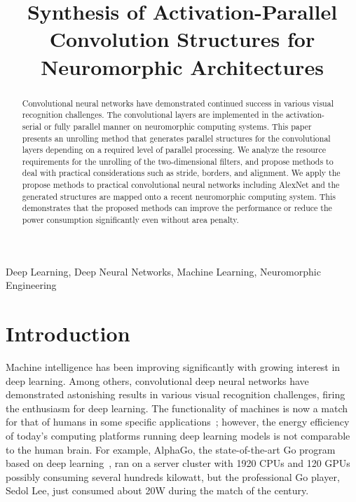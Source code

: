 \documentclass[journal]{IEEEtran}
\begin{document}
%

\title{Synthesis of Activation-Parallel Convolution Structures for Neuromorphic Architectures}

\maketitle
\begin{abstract}
Convolutional neural networks have demonstrated continued success in various visual recognition challenges. The convolutional layers are implemented in the activation-serial or fully parallel manner on neuromorphic computing systems. 
This paper presents an unrolling method that generates parallel structures for the convolutional layers depending on a required level of parallel processing. We analyze the resource requirements for the unrolling of the two-dimensional filters, and propose methods to deal with practical considerations such as stride, borders, and alignment. We apply the propose methods to practical convolutional neural networks including AlexNet and the generated structures are mapped onto a recent neuromorphic computing system. This demonstrates that the proposed methods can improve the performance or reduce the power consumption significantly even without area penalty. 
\end{abstract}

\begin{IEEEkeywords}
Deep Learning, Deep Neural Networks, Machine Learning, Neuromorphic Engineering
\end{IEEEkeywords}

\IEEEpeerreviewmaketitle



\section{Introduction}
Machine intelligence has been improving significantly with growing interest in deep learning. Among others, convolutional deep neural networks have demonstrated astonishing results in various visual recognition challenges, firing the enthusiasm for deep learning. The functionality of machines is now a match for that of humans in some specific applications~\cite{he2015deep}; however, the energy efficiency of today's computing platforms running deep learning models is not comparable to the human brain. For example, AlphaGo, the state-of-the-art Go program based on deep learning~\cite{silver2016mastering}, ran on a server cluster with 1920 CPUs and 120 GPUs possibly consuming several hundreds kilowatt, but the professional Go player, Sedol Lee, just consumed about 20W during the match of the century. 
\end{document}
